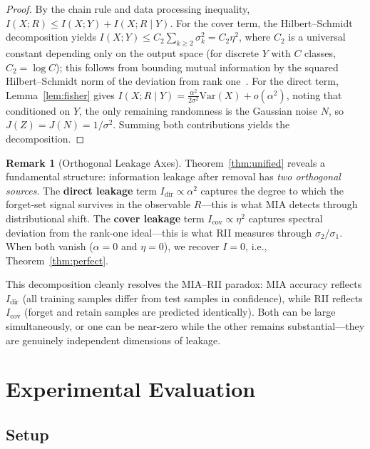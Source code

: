 \documentclass[journal]{IEEEtran}
\theoremstyle{definition}
\newtheorem{remark}[theorem]{Remark}
\begin{document}
\begin{proof}
By the chain rule and data processing inequality, $I(X;R) \le I(X;Y) + I(X;R\mid Y)$. For the cover term, the Hilbert--Schmidt decomposition yields $I(X;Y) \le C_2\sum_{k\ge 2}\sigma_k^2 = C_2\eta^2$, where $C_2$ is a universal constant depending only on the output space (for discrete $Y$ with $C$ classes, $C_2 = \log C$); this follows from bounding mutual information by the squared Hilbert--Schmidt norm of the deviation from rank one~\cite{bloch2021overview}. For the direct term, Lemma~\ref{lem:fisher} gives $I(X;R\mid Y) = \frac{\alpha^2}{2\sigma^2}\mathrm{Var}(X) + o(\alpha^2)$, noting that conditioned on $Y$, the only remaining randomness is the Gaussian noise $N$, so $J(Z)=J(N)=1/\sigma^2$. Summing both contributions yields the decomposition.
\end{proof}

\begin{remark}[Orthogonal Leakage Axes]
Theorem~\ref{thm:unified} reveals a fundamental structure: information leakage after removal has \emph{two orthogonal sources}. The \textbf{direct leakage} term $I_{\mathrm{dir}} \propto \alpha^2$ captures the degree to which the forget-set signal survives in the observable $R$---this is what MIA detects through distributional shift. The \textbf{cover leakage} term $I_{\mathrm{cov}} \propto \eta^2$ captures spectral deviation from the rank-one ideal---this is what RII measures through $\sigma_2/\sigma_1$. When both vanish ($\alpha = 0$ and $\eta = 0$), we recover $I = 0$, i.e., Theorem~\ref{thm:perfect}.
\end{remark}

This decomposition cleanly resolves the MIA--RII paradox: MIA accuracy reflects $I_{\mathrm{dir}}$ (all training samples differ from test samples in confidence), while RII reflects $I_{\mathrm{cov}}$ (forget and retain samples are predicted identically). Both can be large simultaneously, or one can be near-zero while the other remains substantial---they are genuinely independent dimensions of leakage.

\section{Experimental Evaluation}
\label{sec:experiments}

\subsection{Setup}
\end{document}
